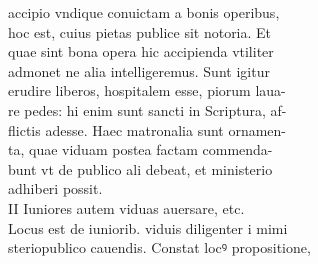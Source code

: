 \documentclass{article}
\begin{document}
\begin{pages}
                accipio vndique conuictam a bonis operibus, \\
                hoc est, cuius pietas publice sit notoria. Et \\
                quae sint bona opera hic accipienda vtiliter \\
                admonet ne alia intelligeremus. Sunt igitur \\
                erudire liberos, hospitalem esse, piorum laua- \\
                re pedes: hi enim sunt sancti in Scriptura, af- \\
                flictis adesse. Haec matronalia sunt ornamen- \\
                ta, quae viduam postea factam commenda- \\
                bunt vt de publico ali debeat, et ministerio \\
                adhiberi possit. \\
                II Iuniores autem viduas auersare, etc. \\
                Locus est de iuniorib. viduis diligenter i mimi \\
                steriopublico cauendis. Constat locꝰ propositione, \\
                

\end{pages}
\end{document}
